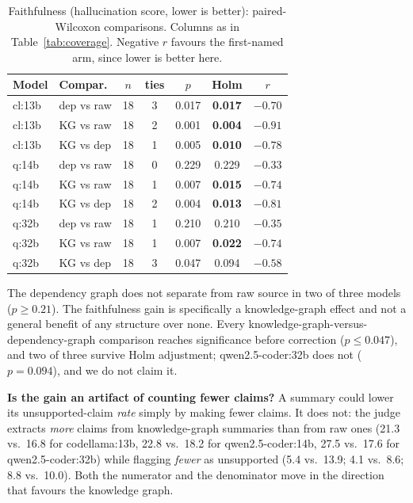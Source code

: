 \documentclass[conference]{IEEEtran}
\begin{document}
\begin{table}[htbp]
\caption{Faithfulness (hallucination score, lower is better): paired-Wilcoxon comparisons.
Columns as in Table~\ref{tab:coverage}. Negative $r$ favours the first-named arm, since lower is
better here.}
\label{tab:faithfulness}
\centering
\footnotesize
\begin{tabular}{@{}p{0.85cm}p{1.25cm}ccccc@{}}
\toprule
Model & Compar. & $n$ & ties & $p$ & Holm & $r$ \\
\midrule
cl:13b & dep vs raw & 18 & 3 & 0.017 & \textbf{0.017} & $-0.70$ \\
cl:13b & KG vs raw & 18 & 2 & 0.001 & \textbf{0.004} & $-0.91$ \\
cl:13b & KG vs dep & 18 & 1 & 0.005 & \textbf{0.010} & $-0.78$ \\
q:14b & dep vs raw & 18 & 0 & 0.229 & 0.229 & $-0.33$ \\
q:14b & KG vs raw & 18 & 1 & 0.007 & \textbf{0.015} & $-0.74$ \\
q:14b & KG vs dep & 18 & 2 & 0.004 & \textbf{0.013} & $-0.81$ \\
q:32b & dep vs raw & 18 & 1 & 0.210 & 0.210 & $-0.35$ \\
q:32b & KG vs raw & 18 & 1 & 0.007 & \textbf{0.022} & $-0.74$ \\
q:32b & KG vs dep & 18 & 3 & 0.047 & 0.094 & $-0.58$ \\
\bottomrule
\end{tabular}
\end{table}

The dependency graph does not separate from raw source in two of three models ($p\ge0.21$). The
faithfulness gain is specifically a knowledge-graph effect and not a general benefit of any
structure over none. Every knowledge-graph-versus-dependency-graph comparison reaches
significance before correction ($p\le0.047$), and two of three survive Holm adjustment;
qwen2.5-coder:32b does not ($p=0.094$), and we do not claim it.

\textbf{Is the gain an artifact of counting fewer claims?} A summary could lower its
unsupported-claim \emph{rate} simply by making fewer claims. It does not: the judge extracts
\emph{more} claims from knowledge-graph summaries than from raw ones (21.3 vs.\ 16.8 for
codellama:13b, 22.8 vs.\ 18.2 for qwen2.5-coder:14b, 27.5 vs.\ 17.6 for qwen2.5-coder:32b) while
flagging \emph{fewer} as unsupported (5.4 vs.\ 13.9; 4.1 vs.\ 8.6; 8.8 vs.\ 10.0). Both the
numerator and the denominator move in the direction that favours the knowledge graph.
\end{document}
